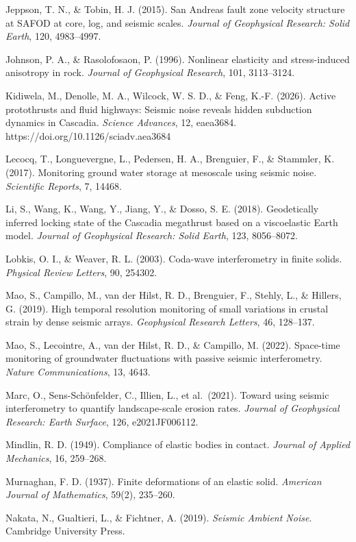 \documentclass[draft]{agujournal2019}
\begin{document}
Jeppson, T. N., \& Tobin, H. J. (2015). San Andreas fault zone velocity
structure at SAFOD at core, log, and seismic scales. \emph{Journal of
Geophysical Research: Solid Earth}, 120, 4983--4997.

Johnson, P. A., \& Rasolofosaon, P. (1996). Nonlinear elasticity and
stress-induced anisotropy in rock. \emph{Journal of Geophysical
Research}, 101, 3113--3124.

Kidiwela, M., Denolle, M. A., Wilcock, W. S. D., \& Feng, K.-F. (2026).
Active protothrusts and fluid highways: Seismic noise reveals hidden
subduction dynamics in Cascadia. \emph{Science Advances}, 12, eaea3684.
https://doi.org/10.1126/sciadv.aea3684

Lecocq, T., Longuevergne, L., Pedersen, H. A., Brenguier, F., \&
Stammler, K. (2017). Monitoring ground water storage at mesoscale using
seismic noise. \emph{Scientific Reports}, 7, 14468.

Li, S., Wang, K., Wang, Y., Jiang, Y., \& Dosso, S. E. (2018).
Geodetically inferred locking state of the Cascadia megathrust based on
a viscoelastic Earth model. \emph{Journal of Geophysical Research: Solid
Earth}, 123, 8056--8072.

Lobkis, O. I., \& Weaver, R. L. (2003). Coda-wave interferometry in
finite solids. \emph{Physical Review Letters}, 90, 254302.

Mao, S., Campillo, M., van der Hilst, R. D., Brenguier, F., Stehly, L.,
\& Hillers, G. (2019). High temporal resolution monitoring of small
variations in crustal strain by dense seismic arrays. \emph{Geophysical
Research Letters}, 46, 128--137.

Mao, S., Lecointre, A., van der Hilst, R. D., \& Campillo, M. (2022).
Space-time monitoring of groundwater fluctuations with passive seismic
interferometry. \emph{Nature Communications}, 13, 4643.

Marc, O., Sens-Schönfelder, C., Illien, L., et al.~(2021). Toward using
seismic interferometry to quantify landscape-scale erosion rates.
\emph{Journal of Geophysical Research: Earth Surface}, 126,
e2021JF006112.

Mindlin, R. D. (1949). Compliance of elastic bodies in contact.
\emph{Journal of Applied Mechanics}, 16, 259--268.

Murnaghan, F. D. (1937). Finite deformations of an elastic solid.
\emph{American Journal of Mathematics}, 59(2), 235--260.

Nakata, N., Gualtieri, L., \& Fichtner, A. (2019). \emph{Seismic Ambient
Noise}. Cambridge University Press.
\end{document}
